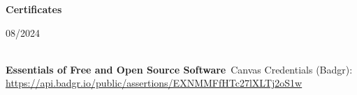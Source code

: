 \textbf{\large Certificates\normalsize}\\
\begin{greytext}08/2024\end{greytext}\\
\textbf{Essentials of Free and Open Source Software}\
Canvas Credentials (Badgr):\\
\url{https://api.badgr.io/public/assertions/EXNMMFfHTc27lXLTj2oS1w}
